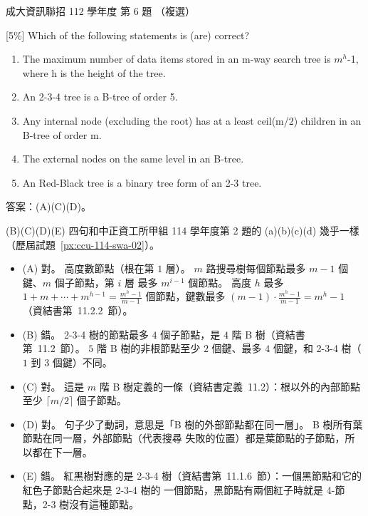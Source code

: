 \begin{pastexam}[label={px:ncku-112-prog-06}]{成大資訊聯招 112 學年度 第 6 題}
（複選）

{[5\%]} Which of the following statements is (are) correct?
\begin{enumerate}[label=(\Alph*)]
\item The maximum number of data items stored in an m-way search tree is $m^h$-1, where h is the height
of the tree.
\item An 2-3-4 tree is a B-tree of order 5.
\item Any internal node (excluding the root) has at a least ceil(m/2) children in an B-tree of order m.
\item The external nodes on the same level in an B-tree.
\item An Red-Black tree is a binary tree form of an 2-3 tree.
\end{enumerate}
\end{pastexam}

\begin{pastsoln}
答案：(A)(C)(D)。

(B)(C)(D)(E) 四句和中正資工所甲組 114 學年度第 2 題的 (a)(b)(c)(d) 幾乎一樣（歷屆試題~\ref{px:ccu-114-swa-02}）。
\begin{itemize}
\item (A) 對。 高度數節點（根在第 $1$ 層）。 $m$ 路搜尋樹每個節點最多 $m - 1$ 個鍵、$m$ 個子節點，第 $i$ 層
最多 $m^{i-1}$ 個節點。 高度 $h$ 最多 $1 + m + \cdots + m^{h-1} = \frac{m^h - 1}{m - 1}$ 個節點，鍵數最多
$(m - 1) \cdot \frac{m^h - 1}{m - 1} = m^h - 1$（資結書第~11.2.2~節）。
\item (B) 錯。 2-3-4 樹的節點最多 $4$ 個子節點，是 $4$ 階 B 樹（資結書第~11.2~節）。 $5$ 階 B 樹的非根節點至少
$2$ 個鍵、最多 $4$ 個鍵，和 2-3-4 樹（$1$ 到 $3$ 個鍵）不同。
\item (C) 對。 這是 $m$ 階 B 樹定義的一條（資結書定義~11.2）：根以外的內部節點至少 $\lceil m/2 \rceil$ 個子節點。
\item (D) 對。 句子少了動詞，意思是「B 樹的外部節點都在同一層」。 B 樹所有葉節點在同一層，外部節點（代表搜尋
失敗的位置）都是葉節點的子節點，所以都在下一層。
\item (E) 錯。 紅黑樹對應的是 2-3-4 樹（資結書第~11.1.6~節）：一個黑節點和它的紅色子節點合起來是 2-3-4 樹的
一個節點，黑節點有兩個紅子時就是 4-節點，2-3 樹沒有這種節點。
\end{itemize}
\end{pastsoln}
